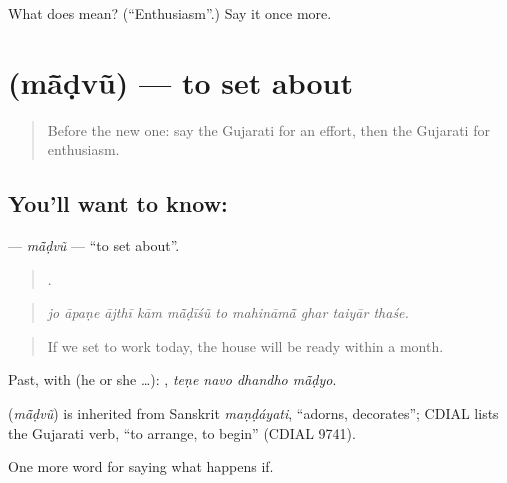 \begin{tcolorbox}[breakable,colback=teal!4,colframe=teal!35!black,title={Before you move on}]
What does  mean? (\textquotedblleft{}Enthusiasm\textquotedblright{}.) Say it once more.
\end{tcolorbox}
\section[\texorpdfstring{\gu{માંડવું} (mā̃ḍvũ)}{માંડવું (mā̃ḍvũ)}]{ (mā̃ḍvũ) — to set about}

\label{lesson:GU-C383-madvu}



\begin{quote}
Before the new one: say the Gujarati for an effort, then the Gujarati for enthusiasm.
\end{quote}

\subsection*{You'll want to know: }
\textbf{} — \emph{mā̃ḍvũ} — \textquotedblleft{}to set about\textquotedblright{}.

\begin{quote}
         .
\end{quote}

\begin{quote}
\emph{jo āpaṇe ājthī kām mā̃ḍīśũ to mahināmā̃ ghar taiyār thaśe.}
\end{quote}

\begin{quote}
If we set to work today, the house will be ready within a month.
\end{quote}

Past, with  (he or she …):    , \emph{teṇe navo dhandho mā̃ḍyo}.

\begin{cousinweb}
\textbf{} (\emph{mā̃ḍvũ}) is inherited from Sanskrit \emph{maṇḍáyati}, \textquotedblleft{}adorns, decorates\textquotedblright{}; CDIAL lists the Gujarati verb, \textquotedblleft{}to arrange, to begin\textquotedblright{} (CDIAL 9741).
\end{cousinweb}

\begin{grammarlens}[title={What you've built}]
One more word for saying what happens if.
\end{grammarlens}

